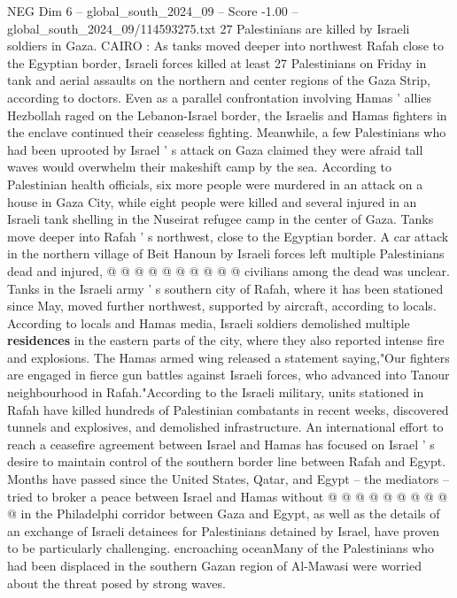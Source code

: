 \begin{textsample}{NEG Dim 6 – global\_south\_2024\_09 – Score -1.00 – global\_south\_2024\_09/114593275.txt}  \label{ex:f6_neg_040}
27 Palestinians are killed by Israeli soldiers in Gaza.
CAIRO : As tanks moved deeper into northwest Rafah close to the Egyptian border, Israeli forces killed at least 27 Palestinians on Friday in tank and aerial assaults on the northern and center regions of the Gaza Strip, according to doctors.
Even as a parallel confrontation involving Hamas ' allies Hezbollah raged on the Lebanon-Israel border, the Israelis and Hamas fighters in the enclave continued their ceaseless fighting.
Meanwhile, a few Palestinians who had been uprooted by Israel ' s attack on Gaza claimed they were afraid tall waves would overwhelm their makeshift camp by the sea.
According to Palestinian health officials, six more people were murdered in an attack on a house in Gaza City, while eight people were killed and several injured in an Israeli tank shelling in the Nuseirat refugee camp in the center of Gaza.
Tanks move deeper into Rafah ' s northwest, close to the Egyptian border.
A car attack in the northern village of Beit Hanoun by Israeli forces left multiple Palestinians dead and injured, @ @ @ @ @ @ @ @ @ @ civilians among the dead was unclear.
Tanks in the Israeli army ' s southern city of Rafah, where it has been stationed since May, moved further northwest, supported by aircraft, according to locals.
According to locals and Hamas media, Israeli soldiers demolished multiple \textbf{residences} in the eastern parts of the city, where they also reported intense fire and explosions.
The Hamas armed wing released a statement saying,"Our fighters are engaged in fierce gun battles against Israeli forces, who advanced into Tanour neighbourhood in Rafah."According to the Israeli military, units stationed in Rafah have killed hundreds of Palestinian combatants in recent weeks, discovered tunnels and explosives, and demolished infrastructure.
An international effort to reach a ceasefire agreement between Israel and Hamas has focused on Israel ' s desire to maintain control of the southern border line between Rafah and Egypt.
Months have passed since the United States, Qatar, and Egypt -- the mediators -- tried to broker a peace between Israel and Hamas without @ @ @ @ @ @ @ @ @ @ in the Philadelphi corridor between Gaza and Egypt, as well as the details of an exchange of Israeli detainees for Palestinians detained by Israel, have proven to be particularly challenging. encroaching oceanMany of the Palestinians who had been displaced in the southern Gazan region of Al-Mawasi were worried about the threat posed by strong waves.

\end{textsample}
